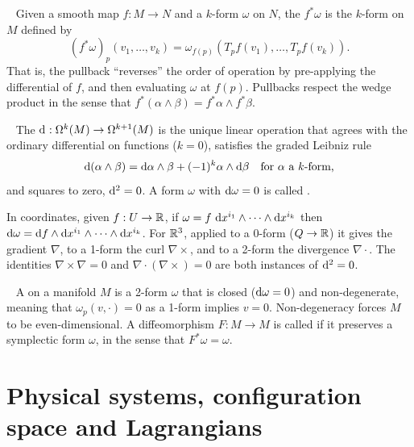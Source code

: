 \label{notion:pullback}~\cite[p. 359]{leeSmoothManifolds2013} Given a smooth map $f : M \to N$ and a $k$-form $\omega$ on $N$, the  $f^* \omega$ is the $k$-form on $M$ defined by
\[ (f^* \omega)_p (v_1, \ldots, v_k) = \omega_{f(p)}\left(T_p f(v_1), \ldots, T_p f(v_k)\right). \]
That is, the pullback ``reverses'' the order of operation by pre-applying the differential of $f$, and then evaluating $\omega$ at $f(p)$. Pullbacks respect the wedge product in the sense that $f^* (\alpha \wedge \beta) = f^* \alpha \wedge f^* \beta$.

\label{notion:exterior-derivative}~\cite[\S14]{leeSmoothManifolds2013} The  $\odif*{}: \Omega^k(M) \to \Omega^{k+1}(M)$ is the unique linear operation that agrees with the ordinary differential on functions ($k = 0$), satisfies the graded Leibniz rule
\[ \odif{(\alpha \wedge \beta)} = \odif{\alpha} \wedge \beta + (-1)^k \alpha \wedge \odif{\beta} \quad \text{for $\alpha$ a $k$-form,} \]
and squares to zero, $\odif*{}^2 = 0$. A form $\omega$ with $\odif{\omega} = 0$ is called .

In coordinates, given $f : U \to {\mathbb{R}}$, if $\omega = f \, \odif{x^{i_1}} \wedge \cdots \wedge \odif{x^{i_k}}$ then $\odif{\omega} = \odif{f} \wedge \odif{x^{i_1}} \wedge \cdots \wedge \odif{x^{i_k}}$. For ${\mathbb{R}}^3$, applied to a 0-form ($Q \to {\mathbb{R}}$) it gives the gradient $\nabla$, to a 1-form the curl $\nabla \times$, and to a 2-form the divergence $\nabla \cdot$. The identities $\nabla \times \nabla = 0$ and $\nabla \cdot (\nabla \times) = 0$ are both instances of $\odif*{}^2 = 0$.

\label{notion:symplectic-forms}~\cite[\S22]{leeSmoothManifolds2013} A  on a manifold $M$ is a 2-form $\omega$ that is closed ($\odif{\omega} = 0$) and non-degenerate, meaning that $\omega_p(v, \cdot) = 0$ as a 1-form implies $v = 0$. Non-degeneracy forces $M$ to be even-dimensional. A diffeomorphism $F : M \to M$ is called  if it preserves a symplectic form $\omega$, in the sense that $F^* \omega = \omega$.

\newpage %
\section{Physical systems, configuration space and Lagrangians}\label{sec:physical-systems-lagrangians}

